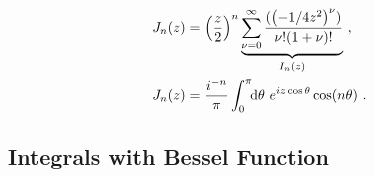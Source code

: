 \begin{gather}
    \begin{aligned}
        J_n(z) &= \left(\frac{z}{2}\right)^n \underbrace{\sum^{\infty}_{\nu = 0} \frac{(\left(- 1/4 z^2\right)^\nu)}{\nu! (1 + \nu) !}}_{I_n(z)}~, \\
        J_n(z) &= \frac{i^{-n}}{\pi} \int_{0}^{\pi}\!\!\mathrm{d}\theta ~ e^{i z \cos \theta} \cos (n\theta)~.
    \end{aligned}
    \label{eq:Besselfunction}
\end{gather}

\newpage

\subsection*{Integrals with Bessel Function}
\label{sub:integralBesselfunction}

